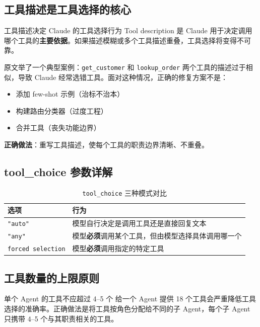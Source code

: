 \documentclass[a4paper]{article}
\begin{document}
\subsection{工具描述是工具选择的核心}

\begin{importantbox}{工具描述决定 Claude 的工具选择行为}
Tool description 是 Claude 用于决定调用哪个工具的\textbf{主要依据}。如果描述模糊或多个工具描述重叠，工具选择将变得不可靠。
\end{importantbox}

原文举了一个典型案例：\texttt{get\_customer} 和 \texttt{lookup\_order} 两个工具的描述过于相似，导致 Claude 经常选错工具。面对这种情况，正确的修复方案不是：
\begin{itemize}[leftmargin=1.5em]
    \item 添加 few-shot 示例（治标不治本）
    \item 构建路由分类器（过度工程）
    \item 合并工具（丧失功能边界）
\end{itemize}
\textbf{正确做法}：重写工具描述，使每个工具的职责边界清晰、不重叠。

\subsection{tool\_choice 参数详解}

\begin{table}[H]
\centering
\begin{tabular}{lp{9cm}}
\toprule
\textbf{选项} & \textbf{行为} \\
\midrule
\texttt{"auto"} & 模型自行决定是调用工具还是直接回复文本 \\
\texttt{"any"} & 模型\textbf{必须}调用某个工具，但由模型选择具体调用哪一个 \\
\texttt{forced selection} & 模型\textbf{必须}调用指定的特定工具 \\
\bottomrule
\end{tabular}
\caption{\texttt{tool\_choice} 三种模式对比}
\end{table}

\subsection{工具数量的上限原则}

\begin{warningbox}{单个 Agent 的工具不应超过 4--5 个}
给一个 Agent 提供 18 个工具会严重降低工具选择的准确率。正确做法是将工具按角色分配给不同的子 Agent，每个子 Agent 只携带 4--5 个与其职责相关的工具。
\end{warningbox}
\end{document}

